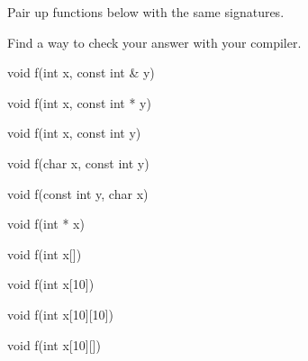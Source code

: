 Pair up functions below with the same signatures.

Find a way to check your answer with your compiler.



\begin{consolethree}[escapeinside=||]

void f(int x, const int & y) {}

void f(int x, const int * y) {}

void f(int x, const int y) {}

void f(char x, const int y) {}

void f(const int y, char x) {}

void f(int * x) {}

void f(int x[]) {}

void f(int x[10]) {}

void f(int x[10][10]) {}

void f(int x[10][]) {}

\end{consolethree}

